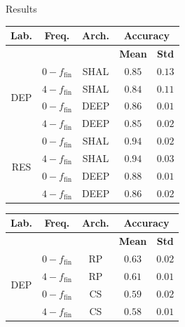 \documentclass{beamer}
\begin{document}

\begin{frame}{Results}
\begin{table}[tbp]
\centering
\scriptsize
  \parbox{0.495\linewidth}{
\centering
\begin{tabular}{|c|c|c|c|c|}
\hline
\textbf{Lab.} & \textbf{Freq.} & \textbf{Arch.} & \multicolumn{2}{c}{\textbf{Accuracy}} \vline \\ \hline
& & & \textbf{Mean} & \textbf{Std} \\ \hline
\multirow{4}{*}{DEP} & $0-f_{\text{fin}}$ & SHAL &  $0.85$ & $0.13$    \\ \cline{2-5}
                     & $4-f_{\text{fin}}$ & SHAL &     $0.84$ & $0.11$    \\ \cline{2-5} 
                     & $0-f_{\text{fin}}$ & DEEP &     $\mathbf{0.86}$ & $0.01$    \\ \cline{2-5} 
                     & $4-f_{\text{fin}}$ & DEEP &     $0.85$ & $0.02$    \\ \hline
\multirow{4}{*}{RES} & $0-f_{\text{fin}}$ & SHAL &  $\mathbf{0.94}$ & $0.02$    \\ \cline{2-5} 
                     & $4-f_{\text{fin}}$ & SHAL &     $0.94$ & $0.03$    \\ \cline{2-5} 
                     & $0-f_{\text{fin}}$ & DEEP &     $0.88$ & $0.01$    \\ \cline{2-5} 
                     & $4-f_{\text{fin}}$ & DEEP &     $0.86$ & $0.02$    \\ \hline
\end{tabular}
}
\hfill
  \parbox{0.495\linewidth}{
\centering
\begin{tabular}{|c|c|c|c|c|}
\hline
\textbf{Lab.} & \textbf{Freq.} & \textbf{Arch.} & \multicolumn{2}{c}{\textbf{Accuracy}} \vline \\ \hline
& & & \textbf{Mean} & \textbf{Std} \\ \hline
\multirow{4}{*}{DEP} & $0-f_{\text{fin}}$ & RP &   $\mathbf{0.63}$ & $0.02$ \\ \cline{2-5}      
                     & $4-f_{\text{fin}}$ & RP &      $0.61$ & $0.01$   \\ \cline{2-5}             
                     & $0-f_{\text{fin}}$ & CS &      $0.59$ & $0.02$  \\ \cline{2-5}              
                     & $4-f_{\text{fin}}$ & CS &      $0.58$ & $0.01$ \\ \hline

\end{tabular}}
\end{table}
\end{frame}
\end{document}
